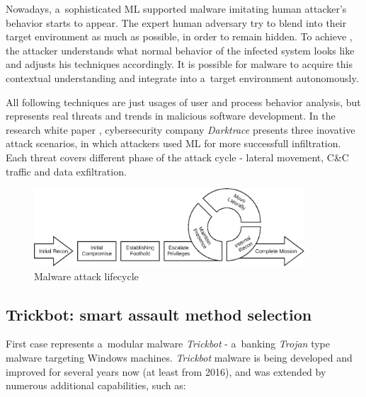 Nowadays, a~sophisticated ML supported malware imitating human attacker's behavior starts to appear.
The expert human adversary try to blend into their target environment as much as possible, in order to remain hidden.
To achieve , the attacker understands what normal behavior of the infected system looks like and adjusts his techniques accordingly.
It is possible for malware to acquire this contextual understanding and integrate into a~target environment autonomously.

All following techniques are just usages of user and process behavior analysis, but represents real threats and trends in malicious software development.
In the research white paper , cybersecurity company \textit{Darktrace} presents three inovative attack scenarios, in which attackers used ML for more successfull infiltration.
Each threat covers different phase of the attack cycle - lateral movement, C\&C traffic and data exfiltration.

\begin{figure}[htb]
    \centering
    \includegraphics[width=0.9\textwidth]{imgs/attack-cycle.eps}
    \caption{Malware attack lifecycle~\cite{article:attack_lifecycle}}
    \label{fig:malware_attack_cycle}
\end{figure}
\FloatBarrier

\subsection{Trickbot: smart assault method selection}\label{subsec:trickbot:-smart-assault-method-selection}

First case represents a~modular malware \textit{Trickbot} - a~banking \textit{Trojan} type malware targeting Windows machines.
\textit{Trickbot} malware is being developed and improved for several years now (at least from 2016), and was extended by numerous additional capabilities, such as:

